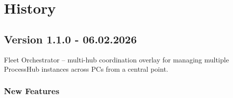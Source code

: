 %
%
%
%
%

\section{History}

\subsection{Version 1.1.0 - 06.02.2026}

Fleet Orchestrator -- multi-hub coordination overlay for managing multiple ProcessHub instances
across PCs from a central point.

\subsubsection{New Features}

